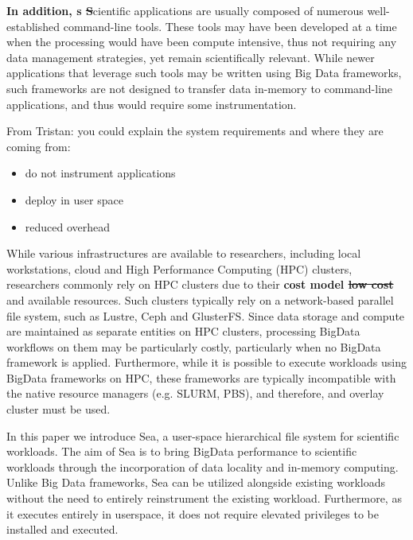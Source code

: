 \documentclass[10pt,journal,compsoc]{IEEEtran}
\newcommand{\suggestion}[2]{\textbf{\color{OliveGreen}#1 \st{#2}\color{black}}}
\newcommand{\tristan}[1]{\color{blue}From Tristan: #1\color{black}}
\begin{document}
\suggestion{In addition, s}{S}cientific applications are usually composed of numerous well-established command-line tools. These tools
may have been developed at a time when the processing would have been compute intensive, thus not requiring any
data management strategies, yet remain scientifically relevant. While newer applications
that leverage such tools may be written using Big Data frameworks, such frameworks are not designed to transfer
data in-memory to command-line applications, and thus would require some instrumentation.

\tristan{you could explain the system requirements and where they are coming from:
\begin{itemize}
\item do not instrument applications
\item deploy in user space
\item reduced overhead
\end{itemize}
}

While various infrastructures are available to researchers, including local workstations, cloud and 
High Performance Computing (HPC) clusters, researchers commonly rely on HPC clusters due to their \suggestion{cost model}{low cost} and available
resources. Such clusters typically rely on a network-based parallel file system, such as Lustre, Ceph and GlusterFS.
Since data storage and compute are maintained as separate entities on HPC clusters, processing BigData workflows on them
may be particularly costly, particularly when no BigData framework is applied. Furthermore, while it is possible to execute
workloads using BigData frameworks on HPC, these frameworks are typically incompatible with the native resource managers (e.g. SLURM, PBS),
and therefore, and overlay cluster must be used.

In this paper we introduce Sea, a user-space hierarchical file system for scientific workloads. The aim of Sea
is to bring BigData performance to scientific workloads through the incorporation of data locality and
in-memory computing. Unlike Big Data frameworks, Sea can be utilized alongside existing workloads without
the need to entirely reinstrument the existing workload. Furthermore, as it executes entirely in userspace,
it does not require elevated privileges to be installed and executed.




\end{document}
